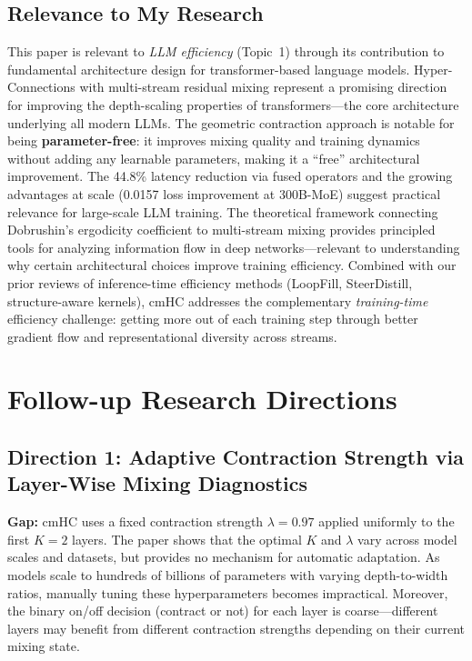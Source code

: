 \documentclass[11pt,a4paper]{article}
\begin{document}
\subsection{Relevance to My Research}
This paper is relevant to \emph{LLM efficiency} (Topic~1) through its contribution to fundamental architecture design for transformer-based language models. Hyper-Connections with multi-stream residual mixing represent a promising direction for improving the depth-scaling properties of transformers---the core architecture underlying all modern LLMs. The geometric contraction approach is notable for being \textbf{parameter-free}: it improves mixing quality and training dynamics without adding any learnable parameters, making it a ``free'' architectural improvement. The 44.8\% latency reduction via fused operators and the growing advantages at scale (0.0157 loss improvement at 300B-MoE) suggest practical relevance for large-scale LLM training. The theoretical framework connecting Dobrushin's ergodicity coefficient to multi-stream mixing provides principled tools for analyzing information flow in deep networks---relevant to understanding why certain architectural choices improve training efficiency. Combined with our prior reviews of inference-time efficiency methods (LoopFill, SteerDistill, structure-aware kernels), cmHC addresses the complementary \emph{training-time} efficiency challenge: getting more out of each training step through better gradient flow and representational diversity across streams.

\section{Follow-up Research Directions}

\subsection{Direction 1: Adaptive Contraction Strength via Layer-Wise Mixing Diagnostics}
\textbf{Gap:} cmHC uses a fixed contraction strength $\lambda{=}0.97$ applied uniformly to the first $K{=}2$ layers. The paper shows that the optimal $K$ and $\lambda$ vary across model scales and datasets, but provides no mechanism for automatic adaptation. As models scale to hundreds of billions of parameters with varying depth-to-width ratios, manually tuning these hyperparameters becomes impractical. Moreover, the binary on/off decision (contract or not) for each layer is coarse---different layers may benefit from different contraction strengths depending on their current mixing state.
\end{document}
